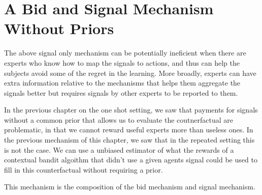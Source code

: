 \section{A Bid and Signal Mechanism Without Priors}



The above signal only mechanism can be potentially ineficient when there are experts who know how to map the signals to actions, and thus can help the subjects avoid some of the regret in the learning.
More broadly, experts can have extra information relative to the mechanisms that helps them aggregate the signals better but requires signals by other experts to be reported to them. 

In the previous chapter on the one shot setting, we saw that payments for  signals without a common prior that allows us to evaluate the coutnerfactual are problematic, in that we cannot reward useful experts more than useless ones. In the previous mechanism of this chapter, we saw that in the repeated setting this is not the case. We can use a unbiased estimator of what the rewards of a contextual bandit algoithm that didn't use a given agents signal could be used to fill in this counterfactual without requiring a prior.

This mechanism is the composition of the bid mechanism and signal mechanism.


